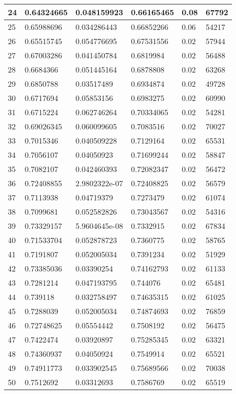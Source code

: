 \begin{longtable}{|l|l|l|l|l|l|}
24 & 0.64324665 & 0.048159923 & 0.66165465 & 0.08 & 67792 \\ \hline 
25 & 0.65988696 & 0.034286443 & 0.66852266 & 0.06 & 54217 \\ \hline 
26 & 0.65515745 & 0.054776695 & 0.67531556 & 0.02 & 57944 \\ \hline 
27 & 0.67003286 & 0.041450784 & 0.6819984 & 0.02 & 56488 \\ \hline 
28 & 0.6684366 & 0.051445164 & 0.6878808 & 0.02 & 63268 \\ \hline 
29 & 0.6850788 & 0.03517489 & 0.6934874 & 0.02 & 49728 \\ \hline 
30 & 0.6717694 & 0.05853156 & 0.6983275 & 0.02 & 60990 \\ \hline 
31 & 0.6715224 & 0.062746264 & 0.70334065 & 0.02 & 54281 \\ \hline 
32 & 0.69026345 & 0.060099605 & 0.7083516 & 0.02 & 70027 \\ \hline 
33 & 0.7015346 & 0.040509228 & 0.7129164 & 0.02 & 65531 \\ \hline 
34 & 0.7056107 & 0.04050923 & 0.71699244 & 0.02 & 58847 \\ \hline 
35 & 0.7082107 & 0.042460393 & 0.72082347 & 0.02 & 56472 \\ \hline 
36 & 0.72408855 & 2.9802322e-07 & 0.72408825 & 0.02 & 56579 \\ \hline 
37 & 0.7113938 & 0.04719379 & 0.7273479 & 0.02 & 61074 \\ \hline 
38 & 0.7099681 & 0.052582826 & 0.73043567 & 0.02 & 54316 \\ \hline 
39 & 0.73329157 & 5.9604645e-08 & 0.7332915 & 0.02 & 67834 \\ \hline 
40 & 0.71533704 & 0.052878723 & 0.7360775 & 0.02 & 58765 \\ \hline 
41 & 0.7191807 & 0.052005034 & 0.7391234 & 0.02 & 51929 \\ \hline 
42 & 0.73385036 & 0.03390254 & 0.74162793 & 0.02 & 61133 \\ \hline 
43 & 0.7281214 & 0.047193795 & 0.744076 & 0.02 & 65481 \\ \hline 
44 & 0.739118 & 0.032758497 & 0.74635315 & 0.02 & 61025 \\ \hline 
45 & 0.7288039 & 0.052005034 & 0.74874693 & 0.02 & 76859 \\ \hline 
46 & 0.72748625 & 0.05554442 & 0.7508192 & 0.02 & 56475 \\ \hline 
47 & 0.7422474 & 0.03920897 & 0.75285345 & 0.02 & 63321 \\ \hline 
48 & 0.74360937 & 0.04050924 & 0.7549914 & 0.02 & 65521 \\ \hline 
49 & 0.74911773 & 0.033902545 & 0.75689566 & 0.02 & 70038 \\ \hline 
50 & 0.7512692 & 0.03312693 & 0.7586769 & 0.02 & 65519 \\ \hline 
\end{longtable}